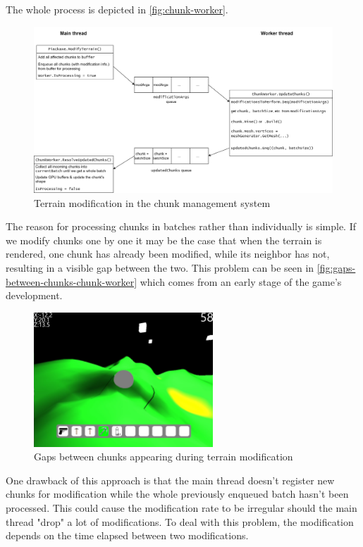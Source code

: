 The whole process is depicted in \autoref{fig:chunk-worker}.
\begin{figure}[!htb] %
    \centering
    \includegraphics[width=1\textwidth]{chapters/implementation/sections/chunk_management_system/resources/chunkWorker.drawio.png}
    \caption{Terrain modification in the chunk management system}
    \label{fig:chunk-worker}
\end{figure}

The reason for processing chunks in batches rather than individually is simple.
If we modify chunks one by one it may be the case that when the terrain is rendered, one chunk has already been modified, while its neighbor has not, resulting in a visible gap between the two.
This problem can be seen in \autoref{fig:gaps-between-chunks-chunk-worker} which comes from an early stage of the game's development.
\begin{figure}[!htb]
    \centering
    \includegraphics[width=0.6\textwidth]{chapters/implementation/sections/chunk_management_system/resources/gaps-between-chunks.png}
    \caption{Gaps between chunks appearing during terrain modification}
    \label{fig:gaps-between-chunks-chunk-worker}
\end{figure}

One drawback of this approach is that the main thread doesn't register new chunks for modification while the whole previously enqueued batch hasn't been processed.
This could cause the modification rate to be irregular should the main thread "drop" a lot of modifications.
To deal with this problem, the modification depends on the time elapsed between two modifications.